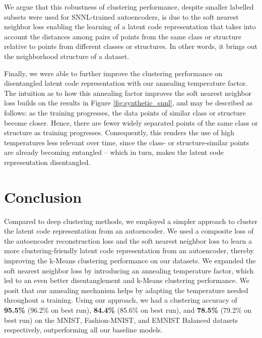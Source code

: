 \documentclass[conference]{IEEEtran}
\begin{document}
We argue that this robustness of clustering performance, despite smaller labelled subsets were used for SNNL-trained autoencoders, is due to the soft nearest neighbor loss enabling the learning of a latent code representation that takes into account the distances among pairs of points from the same class or structure relative to points from different classes or structures. In other words, it brings out the neighborhood structure of a dataset.

Finally, we were able to further improve the clustering performance on disentangled latent code representation with our annealing temperature factor. The intuition as to how this annealing factor improves the soft nearest neighbor loss builds on the results in Figure \ref{fig:synthetic_snnl}, and may be described as follows: as the training progresses, the data points of similar class or structure become closer. Hence, there are fewer widely separated points of the same class or structure as training progresses. Consequently, this renders the use of high temperatures less relevant over time, since the class- or structure-similar points are already becoming entangled -- which in turn, makes the latent code representation disentangled.

\section{Conclusion}
Compared to deep clustering methods\cite{jiang2016variational, mukherjee2019clustergan, xie2016unsupervised}, we employed a simpler approach to cluster the latent code representation from an autoencoder. We used a composite loss of the autoencoder reconstruction loss and the soft nearest neighbor loss to learn a more clustering-friendly latent code representation from an autoencoder, thereby improving the k-Means clustering performance on our datasets. We expanded the soft nearest neighbor loss by introducing an annealing temperature factor, which led to an even better disentanglement and k-Means clustering performance. We posit that our annealing mechanism helps by adapting the temperature needed throughout a training.
Using our approach, we had a clustering accuracy of \textbf{95.5\%} (96.2\% on best run), \textbf{84.4\%} (85.6\% on best run), and \textbf{78.5\%} (79.2\% on best run) on the MNIST, Fashion-MNIST, and EMNIST Balanced datasets respectively, outperforming all our baseline models.
\end{document}
